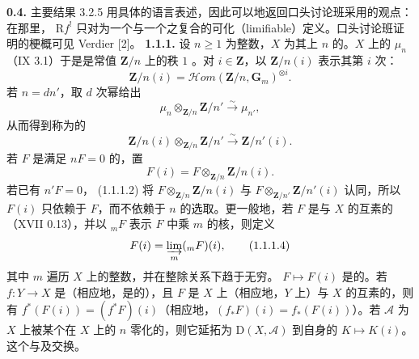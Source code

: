 \textbf{0.4.} 主要结果 3.2.5 用具体的语言表述，因此可以地返回口头讨论班采用的观点：在那里， $\mathrm Rf^!$ 只对为一个与一个之复合的可化（limifiable）定义。口头讨论班证明的梗概可见 Verdier [2]。
\textbf{1.1.1.} 设 $n\geq1$ 为整数，$X$ 为其上 $n$ 的。$X$ 上的 $\mu_n$（IX 3.1）于是是常值 $\mathbf Z/n$ 上的秩 $1$ 。对 $i\in\mathbf Z$，以 $\mathbf Z/n(i)$ 表示其第 $i$ 次：
\begin{equation}\mathbf Z/n(i)=\mathscr Hom(\mathbf Z/n,\mathbf G_m)^{\otimes i}.\tag{1.1.1.1}\end{equation}
若 $n=dn'$，取 $d$ 次幂给出
\[\mu_n\otimes_{\mathbf Z/n}\mathbf Z/n'\xrightarrow\sim\mu_{n'},\]
从而得到称为的
\begin{equation}\mathbf Z/n(i)\otimes_{\mathbf Z/n}\mathbf Z/n'\xrightarrow\sim\mathbf Z/n'(i).\tag{1.1.1.2}\end{equation}
若 $F$ 是满足 $nF=0$ 的，置
\begin{equation}F(i)=F\otimes_{\mathbf Z/n}\mathbf Z/n(i).\tag{1.1.1.3}\end{equation}
若已有 $n'F=0$， (1.1.1.2) 将 $F\otimes_{\mathbf Z/n}\mathbf Z/n(i)$ 与 $F\otimes_{\mathbf Z/n'}\mathbf Z/n'(i)$ 认同，所以 $F(i)$ 只依赖于 $F$，而不依赖于 $n$ 的选取。更一般地，若 $F$ 是与 $X$ 的互素的（XVII 0.13），并以 ${}_mF$ 表示 $F$ 中乘 $m$ 的核，则定义
\begin{equation}F(i)=\varinjlim_m({}_mF)(i),\tag{1.1.1.4}\end{equation}
其中 $m$ 遍历 $X$ 上的整数，并在整除关系下趋于无穷。
 $F\mapsto F(i)$ 是的。若 $f:Y\to X$ 是（相应地，是的），且 $F$ 是 $X$ 上（相应地，$Y$ 上）与 $X$ 的互素的，则有 $f^*(F(i))=(f^*F)(i)$（相应地，$(f_*F)(i)=f_*(F(i))$）。若 $\mathscr A$ 为 $X$ 上被某个在 $X$ 上的 $n$ 零化的，则它延拓为 $\mathrm D(X,\mathscr A)$ 到自身的 $K\mapsto K(i)$。这个与及交换。
